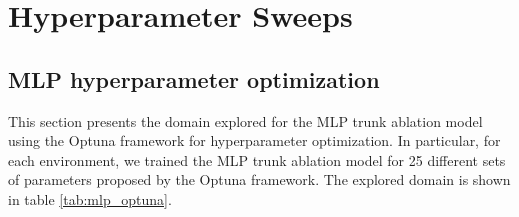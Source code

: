 \section{Hyperparameter Sweeps}\label{app:hyp}

\subsection{MLP hyperparameter optimization}\label{sec:mlp-hyp}
This section presents the domain explored for the MLP trunk ablation model using the Optuna framework for hyperparameter optimization.
In particular, for each environment, we trained the MLP trunk ablation model for 25 different sets of parameters proposed by the Optuna framework. The explored domain is shown in table \ref{tab:mlp_optuna}. 

\begin{table}[htb]
\centering
\caption{MLP hyperparameter domain explored by the Optuna algorithm.
For the learning rate, Optuna sampled values in a continuous interval.
All other parameters were given discrete values.
The hyperparameters used in the original paper are underlined except for Batchnorm, as it is unclear whether it was used in the original paper.
The best hyperparameter configurations found for both environments are in bold.}
\label{tab:mlp_optuna}
\end{table}


